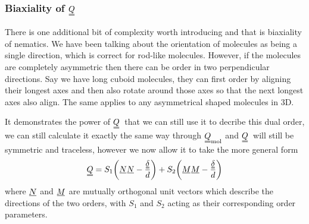 \documentclass[12pt]{article}
\newcommand{\suf}[2]{\stackunder[0.5pt]{\stackunder[1pt]{\ensuremath{#1}}{\rule{\widthof{\ensuremath{#2}}*\real{0.9}}{.1ex}}}{}}
\newcommand{\duf}[2]{\stackunder[0.5pt]{\stackunder[0.8pt]{\stackunder[1pt]{\ensuremath{#1}}{\rule{\widthof{\ensuremath{#2}}*\real{0.9}}{.1ex}}}{\rule{\widthof{\ensuremath{#2}}*\real{0.9}}{.1ex}}}{}}
\newcommand{\su}[1]{\suf{#1}{#1}}
\newcommand{\du}[1]{\duf{#1}{#1}}
\newcommand{\QQ}{\ensuremath{\du{Q}}}
\newcommand{\dudelta}{\ensuremath{\du{\delta}}}
\begin{document}
        \subsubsection{Biaxiality of \QQ}\label{sec:Q_biax}
        There is one additional bit of complexity worth introducing and that is biaxiality of nematics.
        We have been talking about the orientation of molecules as being a single direction, which is correct for rod-like molecules.
        However, if the molecules are completely asymmetric then there can be order in two perpendicular directions.
        Say we have long cuboid molecules, they can first order by aligning their longest axes and then also rotate around those axes so that the next longest axes also align.
        The same applies to any asymmetrical shaped molecules in 3D.

        It demonstrates the power of \QQ\ that we can still use it to decribe this dual order, we can still calculate it exactly the same way through $\du{Q}_\text{mol}$ and \QQ\ will still be symmetric and traceless, however we now allow it to take the more general form
        \begin{equation}
            \du{Q} = S_1\qty(\su{N} \su{N} - \frac{\dudelta}{d}) + S_2\qty(\su{M} \su{M} - \frac{\dudelta}{d})
        \end{equation}
        where $\su{N}$ and $\su{M}$ are mutually orthogonal unit vectors which describe the directions of the two orders, with $S_1$ and $S_2$ acting as their corresponding order parameters.

\end{document}
